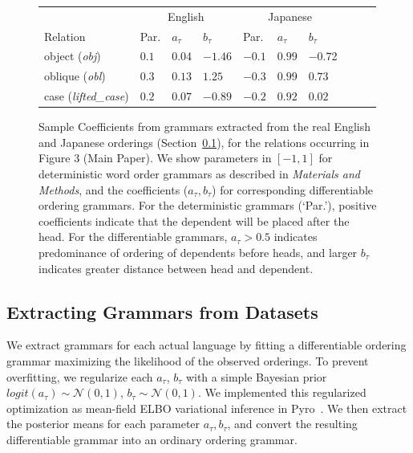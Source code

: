 \documentclass[10pt,twoside,lineno]{article}
\begin{document}
\begin{figure}
	\begin{center}
\begin{tabular}{l||l|ll||l|lllll}
	& \multicolumn{3}{c||}{English}    &  \multicolumn{3}{c}{Japanese}  \\ 
	Relation                     &  Par.   & $a_\tau$ & $b_\tau$            & Par.   & $a_\tau$ & $b_\tau$     \\ \hline \hline
	object (\textit{obj})        &  $0.1$   &   $0.04$   & $-1.46$            & $-0.1$  & $0.99$ & $-0.7$2 \\
	oblique (\textit{obl})       &  $0.3$   &   $0.13$     & $1.25$             & $-0.3$  & $0.99$ & $0.73$ \\
	case (\textit{lifted\_case}) &  $0.2$   &   $0.07$       &   $-0.89$         & $-0.2$  &  $0.92$ & $0.02$  \\
\end{tabular}
	\end{center}
	\caption{Sample Coefficients from grammars extracted from the real English and Japanese orderings (Section~\ref{sec:extract-grammars}), for the relations occurring in Figure 3 (Main Paper). We show parameters in $[-1,1]$ for deterministic word order grammars as described in \emph{Materials and Methods}, and the coefficients ($a_\tau, b_\tau$) for corresponding differentiable ordering grammars. For the deterministic grammars (`Par.'), positive coefficients indicate that the dependent will be placed after the head. For the differentiable grammars, $a_\tau > 0.5$ indicates predominance of ordering of dependents before heads, and larger $b_\tau$ indicates greater distance between head and dependent.}\label{fig:grammar-sample}
\end{figure}


\subsection{Extracting Grammars from Datasets}\label{sec:extract-grammars}
We extract grammars for each actual language by fitting a differentiable ordering grammar maximizing the likelihood of the observed orderings.
To prevent overfitting, we regularize each $a_\tau$, $b_\tau$ with a simple Bayesian prior $logit(a_\tau) \sim \mathcal{N}(0,1)$, $b_\tau \sim \mathcal{N}(0,1)$.
We implemented this regularized optimization as mean-field ELBO variational inference in Pyro~\cite{bingham2018pyro}.
We then extract the posterior means for each parameter $a_\tau, b_\tau$, and convert the resulting differentiable grammar into an ordinary ordering grammar.
\end{document}
